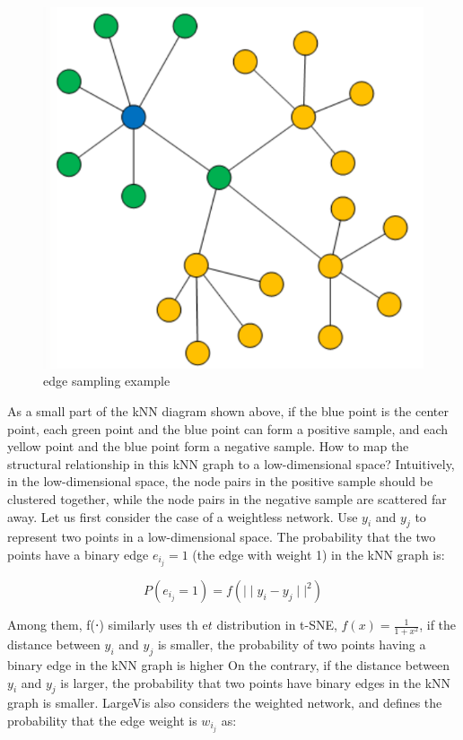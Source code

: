 \begin{figure}[ht]

\centering
\includegraphics[scale=0.85]{images/image_largevis_ld_visulization_1.PNG}
\caption{edge sampling example}
\label{fig:label}
\end{figure}

\noindent As a small part of the kNN diagram shown above, if the blue point is the center point, each green point and the blue point can form a positive sample, and each yellow point and the blue point form a negative sample. How to map the structural relationship in this kNN graph to a low-dimensional space? Intuitively, in the low-dimensional space, the node pairs in the positive sample should be clustered together, while the node pairs in the negative sample are scattered far away. Let us first consider the case of a weightless network. Use $y_i$ and $y_j$ to represent two points in a low-dimensional space. The probability that the two points have a binary edge $e_i_j=1$ (the edge with weight 1) in the kNN graph is:

\begin{equation*}
    P(e_i_j = 1) = f( {\mid \mid y_i - y_j \mid \mid} ^ 2)
\end{equation*}

\noindent Among them, f(⋅) similarly uses th e$t$ distribution in t-SNE, $f(x)= \frac{1}{1+x^2}$, if the distance between $y_i$ and $y_j$ is smaller, the probability of two points having a binary edge in the kNN graph is higher On the contrary, if the distance between $y_i$ and $y_j$ is larger, the probability that two points have binary edges in the kNN graph is smaller. LargeVis also considers the weighted network, and defines the probability that the edge weight is $w_i_j$ as:

